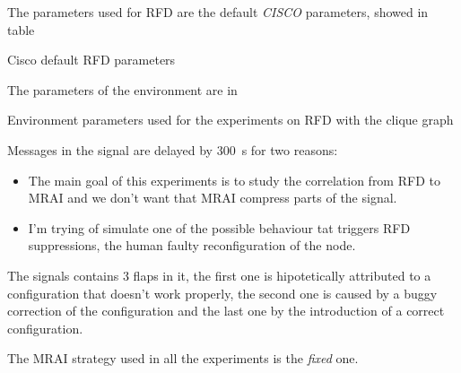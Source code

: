 The parameters used for \ac{RFD} are the default \textit{CISCO} parameters,
showed in table 

\begin{table}[h]
	
	\caption{Cisco default \ac{RFD} parameters}
	\label{tbl:cisco_rfd}
\end{table}

The parameters of the environment are in 

\begin{table}[h]
	
	\caption{Environment parameters used for the experiments on \ac{RFD}
		with the clique graph}
	\label{tbl:clique_rfd_params}
\end{table}

Messages in the signal are delayed by \SI{300}{\second} for two reasons:
\begin{itemize}
	\item The main goal of this experiments is to study the correlation from
		\ac{RFD} to \ac{MRAI} and we don't want that \ac{MRAI} compress
		parts of the signal.
	\item I'm trying of simulate one of the possible behaviour tat triggers
		\ac{RFD} suppressions, the human faulty reconfiguration of the node.
\end{itemize}

The signals contains \num{3} flaps in it, the first one is hipotetically attributed
to a configuration that doesn't work properly, the second one is caused by a
buggy correction of the configuration and the last one by the introduction of a
correct configuration.

The \ac{MRAI} strategy used in all the experiments is the \textit{fixed} one.

